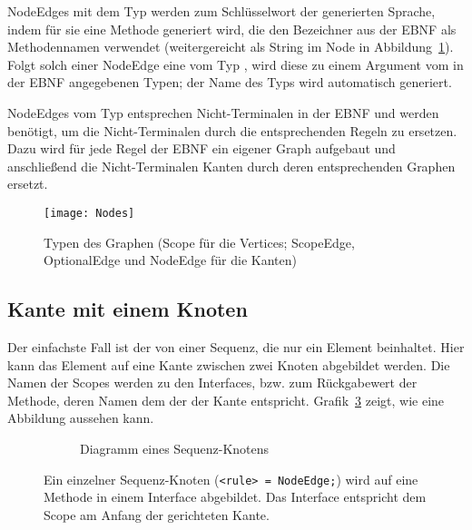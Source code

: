 \documentclass[../InterneDSLs.tex]{subfiles}
\begin{document}
NodeEdges mit dem Typ  werden zum Schlüsselwort der generierten Sprache, indem für sie eine Methode generiert wird, die den Bezeichner aus der EBNF als Methodennamen verwendet (weitergereicht als String im Node in Abbildung~\ref{FIG:GraphTypes}). Folgt solch einer NodeEdge eine vom Typ , wird diese zu einem Argument vom in der EBNF angegebenen Typen; der Name des Typs wird automatisch generiert.

NodeEdges vom Typ  entsprechen Nicht-Terminalen in der EBNF und werden benötigt, um die Nicht-Terminalen durch die entsprechenden Regeln zu ersetzen. Dazu wird für jede Regel der EBNF ein eigener Graph aufgebaut und anschließend die Nicht-Terminalen Kanten durch deren entsprechenden Graphen ersetzt.
\begin{figure}[ht]
\centering
\texttt{[image: Nodes]}
\caption[Typen des Graphen]{Typen des Graphen (Scope für die Vertices; ScopeEdge, OptionalEdge und NodeEdge für die Kanten)}
\label{FIG:GraphTypes}
\end{figure}

\subsection{Kante mit einem Knoten}\label{SEC:OneNode}
Der einfachste Fall ist der von einer Sequenz, die nur ein Element beinhaltet. Hier kann das Element auf eine Kante zwischen zwei Knoten abgebildet werden. Die Namen der Scopes werden zu den Interfaces, bzw. zum Rückgabewert der Methode, deren Namen dem der der Kante entspricht. Grafik~\ref{FIG:OneElementNode} zeigt, wie eine Abbildung aussehen kann.
\begin{figure}[ht]
\centering
  \begin{subfigure}[c]{0.49\textwidth}
    \caption{Diagramm eines Sequenz-Knotens}
    \label{FIG:DiagramOneElementNode}
  \end{subfigure}
  \begin{subfigure}[c]{0.49\textwidth}
    
  \end{subfigure}
  \caption[Abbildung eines Sequenz-Knotens (\texttt{<rule> = NodeEdge;})]{Ein einzelner Sequenz-Knoten (\texttt{<rule> = NodeEdge;}) wird auf eine Methode in einem Interface abgebildet. Das Interface entspricht dem Scope am Anfang der gerichteten Kante.}
  \label{FIG:OneElementNode}
\end{figure}
\end{document}
